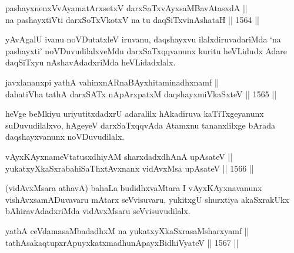 
\begin{shl}
\footnotemark[4]pashayxnenxVvAyamatArx\s \s setxV darxSaTxvAyxsaMBavAtasxdA || \\
na pashayxtiVti darxSoTxVkotxV na tu daqSiTxvinAshataH \hfill || 1564 ||  
\end{shl}

\begin{artha}
yAvAgalU ivanu noVDutatxleV iruvanu, daqshayxvu ilalxdiruvadariMda `na pashayxti' noVDuvudilalxveMdu darxSaTxqqvanunx kuritu heVLidudx Adare daqSiTxyu nAshavAdadxriMda heVLidadxlalx.
\end{artha}

\begin{shl}
\footnotemark[5]javxlananxpi yathA vahinxnARnaBAyxhitaminadhxnamf || \\
dahatiVha tathA darxSATx nApArxpatxM daqshayxmiVkaSxteV \hfill || 1565 ||  
\end{shl}

\begin{artha}
heVge beMkiyu uriyutitxdadxrU adaralilx hAkadiruva kaTiTxgeyanunx suDuvudilalxvo, hAgeyeV darxSaTxqqvAda Atamxnu tananxlilxge bArada daqshayxvanunx noVDuvudilalx.
\end{artha}



\begin{shl}
vAyxKAyxnameVtatusxdhiyAM sharxdadxdhAnA upAsateV || \\
yukatxyXkaSxrabahiSaThxtAvxnanx vidAvxMsa upAsateV \hfill || 1566 ||  
\end{shl}

\begin{artha}
(vidAvxMsara athavA) bahaLa budidhxvaMtara I vAyxKAyxnavanunx vishAvxsamADuvavaru mAtarx seVvisuvaru, yukitxgU shurxtiya akaSxrakUkx bAhiravAdadxriMda vidAvxMsaru seVvisuvudilalx.
\end{artha}

\begin{shl}
yathA ceVdamasaMbadadhxM na yukatxyXkaSxrasaMsharxyamf || \\
tathA\s sakaqtupxrA\s puyxkatxmadhunA\s payxBidhiVyateV \hfill || 1567 ||  
\end{shl}


